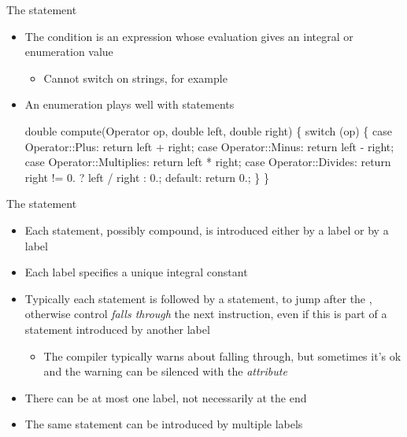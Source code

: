 \begin{frame}[fragile]{The  statement \insertcontinuationtext}

  \begin{itemize}
  \item The condition is an expression whose evaluation gives an integral or
    enumeration value
    \begin{itemize}
    \item Cannot switch on strings, for example
    \end{itemize}

  \item An enumeration plays well with  statements

    \begin{codeblock}
double compute(Operator op, double left, double right)
\{
  switch (op) \{
    case Operator::Plus:       return left + right;
    case Operator::Minus:      return left - right;
    case Operator::Multiplies: return left * right;
    case Operator::Divides:    return right != 0. ? left / right : 0.;
    default: return 0.;
  \}
\}\end{codeblock}

  \end{itemize}
\end{frame}

\begin{frame}{The  statement \insertcontinuationtext}
  \begin{itemize}
  \item Each statement, possibly compound, is introduced either by a 
    label or by a  label
  \item Each  label specifies a unique integral constant
  \item Typically each statement is followed by a  statement, to
    jump after the , otherwise control \textit{falls through} the
    next instruction, even if this is part of a statement introduced by another
    label
    \begin{itemize}
    \item The compiler typically warns about falling through, but sometimes it's
      ok and the warning can be silenced with the \code{[[fallthrough]]}
      \textit{attribute}
    \end{itemize}
  \item There can be at most one  label, not necessarily at the
    end
  \item The same statement can be introduced by multiple  labels
  \end{itemize}

\end{frame}

